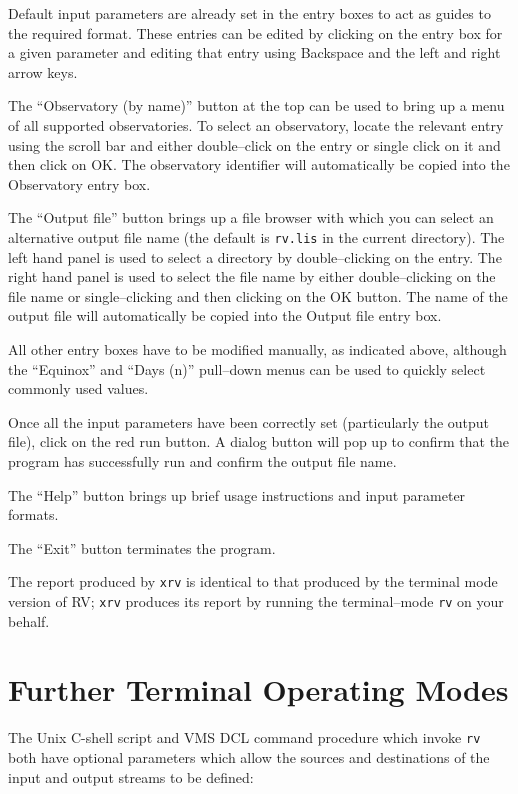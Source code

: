 \documentclass[11pt,noabs,nolof]{starlink}
\begin{document}
Default input parameters are already set in the entry boxes to act as
guides to the required format. These entries can be edited by clicking
on the entry box for a given parameter and editing that entry using
Backspace and the left and right arrow keys.

The ``Observatory (by name)'' button at the top can be used to bring up
a menu of all supported observatories. To select an observatory, locate
the relevant entry using the scroll bar and either double--click on the
entry or single click on it and then click on OK. The observatory identifier
will automatically be copied into the Observatory entry box.

The ``Output file'' button brings up a file browser with which you can
select an alternative output file name (the default is {\tt{rv.lis}} in
the current directory). The left hand panel is used to select a
directory by double--clicking on the entry. The right hand panel is
used to select the file name by either double--clicking on the file
name or single--clicking and then clicking on the OK button. The name
of the output file will automatically be copied into the Output file
entry box.

All other entry boxes have to be modified manually, as indicated above,
although the ``Equinox'' and ``Days (n)'' pull--down menus can be used
to quickly select commonly used values.

Once all the input parameters have been correctly set (particularly
the output file), click on the red run button. A dialog button will
pop up to confirm that the program has successfully run and confirm the
output file name.

The ``Help'' button brings up brief usage instructions and input
parameter formats.

The ``Exit'' button terminates the program.

The report produced by {\tt{xrv}} is identical to that produced by
the terminal mode version of RV; {\tt{xrv}} produces its report by
running the terminal--mode {\tt{rv}} on your behalf.

\section{Further Terminal Operating Modes}

The Unix C-shell script and VMS DCL command procedure which invoke
{\tt{rv}} both have optional parameters which allow the sources and
destinations of the input and output streams to be defined:
\end{document}

